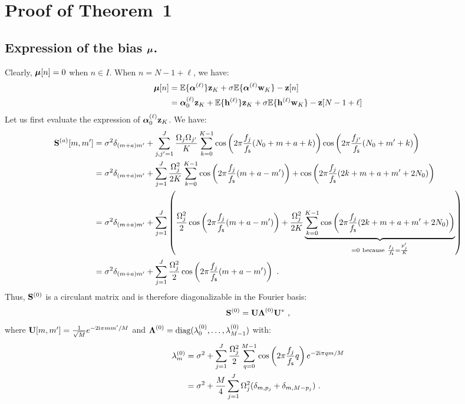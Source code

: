 \documentclass[journal, onecolumn]{IEEEtran}
\begin{document}
\section{Proof of Theorem~1}
\label{ap:th.error}

\subsection{Expression of the bias $\boldsymbol{\mu}$.}
Clearly, $\boldsymbol{\mu}[n]=0$ when $n\in I$. When $n=N-1+\ell$, we have:
\begin{align*}
\boldsymbol{\mu}[n] &=  {\mathbb E}\{\boldsymbol{\alpha}^{(\ell)}\}{\mathbf z}_{K} + \sigma{\mathbb E}\{\boldsymbol{\alpha}^{(\ell)}{\mathbf w}_{K}\} - {\mathbf z}[n]\\
& = \boldsymbol{\alpha}_0^{(\ell)}{\mathbf z}_{K} + {\mathbb E}\{{\mathbf h}^{(\ell)}\}{\mathbf z}_{K} + \sigma{\mathbb E}\{{\mathbf h}^{(\ell)}{\mathbf w}_{K}\} - {\mathbf z}[N-1+\ell]
\end{align*}
Let us first evaluate the expression of $\boldsymbol{\alpha}_0^{(\ell)}{\mathbf z}_K$. We have:
\begin{align*}
\bS^{(a)}[m,m'] &= \sigma^2\delta_{(m+a)m'}+\sum_{j,j'=1}^J\dfrac{\Omega_j\Omega_{j'}}{K}\sum_{k=0}^{K-1} \cos\left(2\pi \frac{f_j}{\fs}(N_0+m+a+k)\right)\cos\left(2\pi \frac{f_{j'}}{\fs}(N_0+m'+k)\right) \\
&= \sigma^2\delta_{(m+a)m'}+\sum_{j=1}^J\dfrac{\Omega_j^2}{2K}\sum_{k=0}^{K-1} \cos\left(2\pi \frac{f_j}{\fs}(m+a-m')\right) + \cos\left(2\pi \frac{f_j}{\fs}(2k+m+a+m'+2N_0)\right)\\
&= \sigma^2\delta_{(m+a)m'}+\sum_{j=1}^J\left( \dfrac{\Omega_j^2}2\cos\left(2\pi \frac{f_j}{\fs}(m+a-m')\right) + \dfrac{\Omega_j^2}{2K}\underbrace{\sum_{k=0}^{K-1}\cos\left(2\pi \frac{f_j}{\fs}(2k+m+a+m'+2N_0)\right)}_{=0\ \mathrm{because}\ \frac{f_j}\fs=\frac{p'_j}K } \right)\\
&= \sigma^2\delta_{(m+a)m'}+\sum_{j=1}^J\dfrac{\Omega_j^2}2\cos\left(2\pi \frac{f_j}{\fs}(m+a-m')\right)\ .
\end{align*}
Thus, ${\mathbf S}^{(0)}$ is a circulant matrix and is therefore diagonalizable in the Fourier basis:
\[
{\mathbf S}^{(0)} = {\mathbf U}\boldsymbol{\Lambda}^{(0)}{\mathbf U}^*\ ,
\]
where ${\mathbf U}[m,m']=\frac1{\sqrt{M}}e^{-2\mathrm{i}\pi mm'/M}$ and $\boldsymbol{\Lambda}^{(0)} = \mathrm{diag}(\lambda_0^{(0)},\dots,\lambda_{M-1}^{(0)})$ with:
\begin{align*}
\lambda_m^{(0)} &= \sigma^2 + \sum_{j=1}^J\dfrac{\Omega_j^2}2\sum_{q=0}^{M-1} \cos\left(2\pi\frac{f_j}{f_{\mathsf s}} q\right) e^{-2\mathrm{i}\pi qm/M} \\
&= \sigma^2 + \dfrac{M}{4}\sum_{j=1}^J\Omega_j^2(\delta_{m,p_j} + \delta_{m,M-p_j})\ .
\end{align*}
\end{document}

